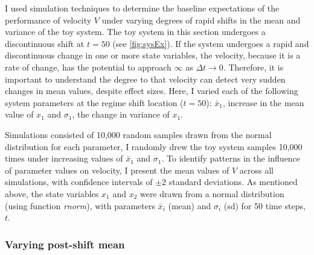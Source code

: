 \documentclass[12pt,twoside,openany]{reedthesis}
\begin{document}
I used simulation techniques to determine the baseline expectations of the performance of velocity \(V\) under varying degrees of rapid shifts in the mean and variance of the toy system. The toy system in this section undergoes a discontinuous shift at \(t = 50\) (see \ref{fig:sysEx}). If the system undergoes a rapid and discontinuous change in one or more state variables, the velocity, because it is a rate of change, has the potential to approach \(\infty\) as \(\Delta t \rightarrow 0\). Therefore, it is important to understand the degree to that velocity can detect very sudden changes in mean values, despite effect sizes. Here, I varied each of the following system parameters at the regime shift location (\(t=50\)): \(\bar{x}_1\), increase in the mean value of \(x_1\) and \(\sigma_1\), the change in variance of \(x_1\).

Simulations consisted of 10,000 random samples drawn from the normal distribution for each parameter, I randomly drew the toy system samples 10,000 times under increasing values of \(\bar{x}_1\) and \(\sigma_1\). To identify patterns in the influence of parameter values on velocity, I present the mean values of \(V\) across all simulations, with confidence intervals of \(\pm 2\) standard deviations. As mentioned above, the state variables \(x_1\) and \(x_2\) were drawn from a normal distribution (using function \emph{rnorm}), with parameters \(\bar{x}_i\) (mean) and \(\sigma_i\) (sd) for 50 time steps, \(t\).

\hypertarget{varying-post-shift-mean}{%
\subsubsection{Varying post-shift mean}\label{varying-post-shift-mean}}
\end{document}
